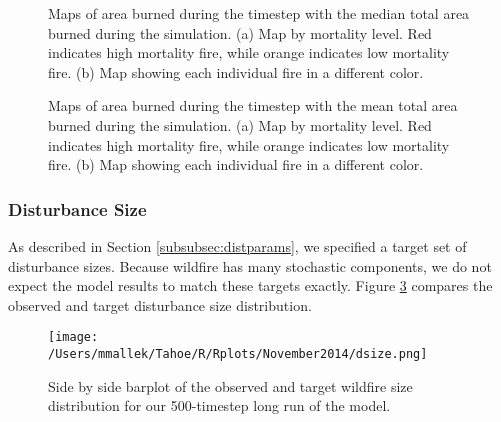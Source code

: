 \begin{figure}[!htbp]
  \centering
  \caption{Maps of area burned during the timestep with the median total area burned during the simulation. (a) Map by mortality level. Red indicates high mortality fire, while orange indicates low mortality fire. (b) Map showing each individual fire in a different color.}
  \label{fig:darea_median_map}
\end{figure}

\begin{figure}[!htbp]
  \centering
  \caption{Maps of area burned during the timestep with the mean total area burned during the simulation. (a) Map by mortality level. Red indicates high mortality fire, while orange indicates low mortality fire. (b) Map showing each individual fire in a different color.}
  \label{fig:darea_mean_map}
\end{figure}

\subsubsection{Disturbance Size}
As described in Section \ref{subsubsec:distparams}, we specified a target set of disturbance sizes. Because wildfire has many stochastic components, we do not expect the model results to match these targets exactly. Figure \ref{fig:dsize} compares the observed and target disturbance size distribution.



\begin{figure}[!htbp]
\centering
\texttt{[image: /Users/mmallek/Tahoe/R/Rplots/November2014/dsize.png]}
\caption{Side by side barplot of the observed and target wildfire size distribution for our 500-timestep long run of the model.}
\label{fig:dsize}
\end{figure}



